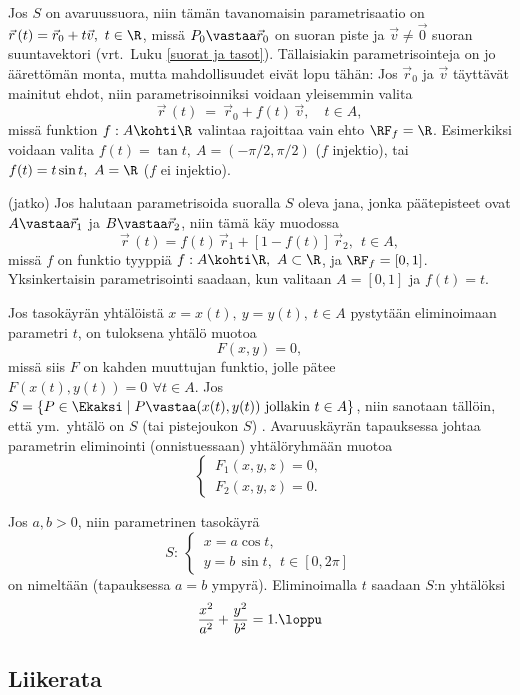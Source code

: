 \begin{Exa} Jos $S$ on avaruussuora, niin tämän tavanomaisin parametrisaatio on 
$\vec{r}\,(t) = \vec{r}_0 + t \vec{v},\ t \in \R$, missä $P_0 \vastaa \vec{r}_0$ on suoran
piste ja $\vec{v} \neq \vec{0}$ suoran suuntavektori (vrt.\ Luku \ref{suorat ja tasot}).
Tällaisiakin parametrisointeja on jo äärettömän monta, mutta mahdollisuudet eivät lopu tähän:
Jos $\vec{r}_0$ ja $\vec{v}$ täyttävät mainitut ehdot, niin parametrisoinniksi voidaan
yleisemmin valita
\[ 
\vec{r}\,(t)\ =\ \vec{r}_0 + f(t)\,\vec{v}, \quad t \in A, 
\]
missä funktion $f: A \kohti \R$ valintaa rajoittaa vain ehto $\RF_f = \R$. Esimerkiksi voidaan 
valita $f(t) = \tan t,\ A = (-\pi/2,\pi/2)$ ($f$ injektio), tai $f(t) = t \sin t,\ A = \R$ 
($f$ ei injektio).  \loppu \end{Exa}
\jatko \begin{Exa} (jatko) Jos halutaan parametrisoida suoralla $S$ oleva jana, jonka 
päätepisteet ovat $A \vastaa \vec{r}_1$ ja $B \vastaa \vec{r}_2$, niin tämä käy muodossa
\[ 
\vec{r}\,(t) = f(t)\,\vec{r}_1 + [1-f(t)]\,\vec{r}_2,\ \ t \in A, 
\]
missä $f$ on funktio tyyppiä $f: A \kohti \R,\ A \subset \R$, ja $\RF_f = [0,1]$.
Yksinkertaisin parametrisointi saadaan, kun valitaan $A = [0,1]$ ja $f(t) = t$. \loppu 
\end{Exa}
Jos tasokäyrän yhtälöistä $x = x(t),\ y = y(t),\ t \in A$ pystytään eliminoimaan parametri
$t$, on tuloksena yhtälö muotoa
\[ 
F(x,y) = 0, 
\]
missä siis $F$ on kahden muuttujan funktio, jolle pätee $F(x(t),y(t)) = 0\,\ \forall t \in A$.
Jos $S = \{P \in \Ekaksi \mid P \vastaa (x(t),y(t))\ \text{jollakin}\ t \in A\}$, niin
sanotaan tällöin, että ym.\ yhtälö on  $S$ (tai pistejoukon $S$) .
Avaruuskäyrän tapauksessa johtaa parametrin eliminointi (onnistuessaan) yhtälöryhmään muotoa
\[ 
\begin{cases} \,F_1(x,y,z) = 0, \\ \,F_2(x,y,z) = 0. \end{cases} 
\]
\begin{Exa} Jos $a,b>0$, niin parametrinen tasokäyrä
\[ 
S:\ \begin{cases} \,x = a\cos t, \\ \,y = b\,\sin t,\ \ t \in [0,2\pi] \end{cases} 
\]
on nimeltään  (tapauksessa $a=b$ ympyrä). Eliminoimalla $t$ saadaan $S$:n
yhtälöksi
\[ 
\frac{x^2}{a^2} + \frac{y^2}{b^2} = 1. \loppu
\]
\end{Exa}

\subsection{Liikerata}

